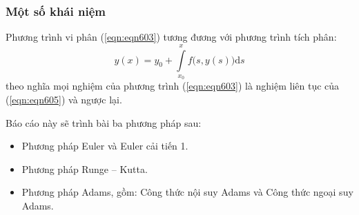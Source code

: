 \begin{frame}
	\frametitle{Một số khái niệm}
	Phương trình vi phân (\ref{eqn:eqn603}) tương đương với phương trình tích phân:
	\begin{equation}\label{eqn:eqn605}
		y(x)= y_0 + \int\limits_{x_0}^{x} f\big(s, y\left(s\right)\big)\mathrm{d}s
	\end{equation}
	theo nghĩa mọi nghiệm của phương trình (\ref{eqn:eqn603}) là nghiệm liên tục của (\ref{eqn:eqn605}) và ngược lại.
\end{frame}

\begin{frame}
	Báo cáo này sẽ trình bài ba phương pháp sau:\par
	\begin{itemize}
		\item Phương pháp Euler và Euler cải tiến 1.
		\item Phương pháp Runge – Kutta.
		\item Phương pháp Adams, gồm: Công thức nội suy Adams và Công thức ngoại suy Adams.
	\end{itemize}
\end{frame}